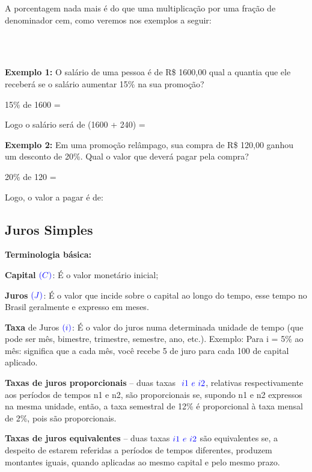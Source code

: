 \begin{multicols*}{2}
A porcentagem nada mais é do que uma multiplicação por uma fração de denominador cem, como veremos nos exemplos a seguir:

\\

\\


	\textbf{Exemplo 1:} O salário de uma pessoa é de R\$ 1600,00 qual a quantia que ele receberá se o salário aumentar 15\% na sua promoção?
	
	15\% de 1600  =  

	Logo o salário será de (1600 + 240) = 
	
	\textbf{Exemplo 2:} Em uma promoção relâmpago, sua compra de R\$ 120,00 ganhou um desconto de 20\%. Qual o valor que deverá pagar pela compra?
	
	20\% de 120  =  
	
	Logo, o valor a pagar é de: 
	
	\subsection{Juros Simples}
	
	\textbf{Terminologia básica:}
	
	\textbf{Capital} $\color{blue}(C)$: É o valor monetário inicial;
	
	\textbf{Juros} $\color{blue}(J)$: É o valor que incide sobre o capital ao longo do tempo, esse tempo no Brasil geralmente e expresso em meses.
	
	\textbf{Taxa} de Juros $\color{blue}(i)$: É o valor do juros numa determinada unidade de tempo (que pode ser mês, bimestre, trimestre, semestre, ano, etc.). Exemplo: Para i = 5\% ao mês: significa que a cada mês, você recebe 5 de juro para cada 100 de capital aplicado.
	
	\textbf{Taxas de juros proporcionais} – duas taxas  $\color{blue} \ i1\ e \ i2$, relativas respectivamente aos períodos de tempos n1 e n2, são proporcionais se, supondo n1 e n2 expressos na mesma unidade, então, a taxa semestral de 12\% é proporcional à taxa mensal de 2\%, pois são proporcionais.

	\textbf{Taxas de juros equivalentes} – duas taxas$\color{blue} \  i1 \ e \ i2$ são equivalentes se, a despeito de estarem referidas a períodos de tempos diferentes, produzem montantes iguais, quando aplicadas ao mesmo capital e pelo mesmo prazo.


\end{multicols*}
